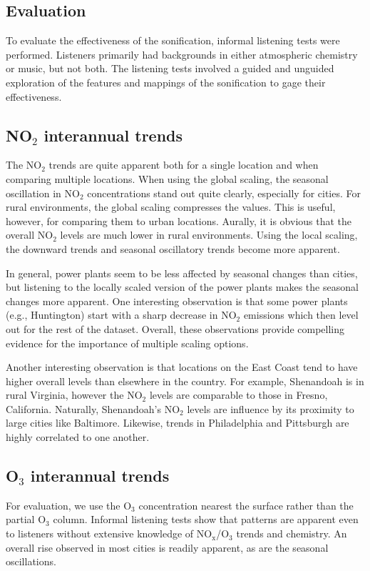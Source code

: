 \documentclass[a4paper,10pt,oneside]{article}
\newcommand{\ce}[1]{$\mathrm{#1}$}
\begin{document}
\begin{sloppy}
\section{Evaluation}

To evaluate the effectiveness of the sonification, informal listening tests were performed. Listeners primarily had backgrounds in either atmospheric chemistry or music, but not both. The listening tests involved a guided and unguided exploration of the features and mappings of the sonification to gage their effectiveness.  

\subsection{NO$_2$ interannual trends}
The \ce{NO_2} trends are quite apparent both for a single location and when comparing multiple locations.  When using the global scaling, the seasonal oscillation in \ce{NO_2} concentrations stand out quite clearly, especially for cities. For rural environments, the global scaling compresses the values.  This is useful, however, for comparing them to urban locations.  Aurally, it is obvious that the overall \ce{NO_2} levels are much lower in rural environments. Using the local scaling, the downward trends and seasonal oscillatory trends become more apparent. 

In general, power plants seem to be less affected by seasonal changes than cities, but listening to the locally scaled version of the power plants makes the seasonal changes more apparent. One interesting observation is that some power plants (e.g., Huntington) start with a sharp decrease in \ce{NO_2} emissions which then level out for the rest of the dataset. Overall, these observations provide compelling evidence for the importance of multiple scaling options.  

Another interesting observation is that locations on the East Coast tend to have higher overall levels than elsewhere in the country.  For example, Shenandoah is in rural Virginia, however the \ce{NO_2} levels are comparable to those in Fresno, California.  Naturally, Shenandoah's  \ce{NO_2} levels are influence by its proximity to large cities like Baltimore. Likewise, trends in Philadelphia and Pittsburgh are highly correlated to one another. 

\subsection{O$_3$ interannual trends}
For evaluation, we use the \ce{O_3} concentration nearest the surface rather than the partial \ce{O_3} column.  Informal listening tests show that patterns are apparent even to listeners without extensive knowledge of \ce{NO_x}/\ce{O_3} trends and chemistry.  An overall rise observed in most cities is readily apparent, as are the seasonal oscillations. 


\end{sloppy}
\end{document}
